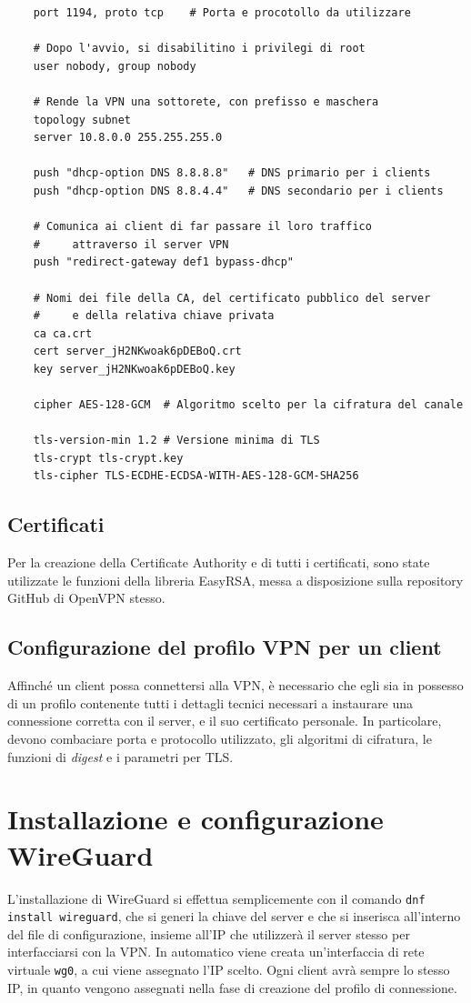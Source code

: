 \begin{verbatim}
    port 1194, proto tcp    # Porta e procotollo da utilizzare
    
    # Dopo l'avvio, si disabilitino i privilegi di root
    user nobody, group nobody   

    # Rende la VPN una sottorete, con prefisso e maschera
    topology subnet         
    server 10.8.0.0 255.255.255.0

    push "dhcp-option DNS 8.8.8.8"   # DNS primario per i clients
    push "dhcp-option DNS 8.8.4.4"   # DNS secondario per i clients

    # Comunica ai client di far passare il loro traffico 
    #     attraverso il server VPN
    push "redirect-gateway def1 bypass-dhcp"   

    # Nomi dei file della CA, del certificato pubblico del server 
    #     e della relativa chiave privata
    ca ca.crt
    cert server_jH2NKwoak6pDEBoQ.crt
    key server_jH2NKwoak6pDEBoQ.key
    
    cipher AES-128-GCM  # Algoritmo scelto per la cifratura del canale

    tls-version-min 1.2 # Versione minima di TLS
    tls-crypt tls-crypt.key
    tls-cipher TLS-ECDHE-ECDSA-WITH-AES-128-GCM-SHA256  
\end{verbatim}

\subsection{Certificati}
Per la creazione della Certificate Authority e di tutti i certificati, sono state utilizzate le funzioni della libreria EasyRSA, messa a disposizione sulla repository GitHub di OpenVPN stesso.

\subsection{Configurazione del profilo VPN per un client}
Affinché un client possa connettersi alla VPN, è necessario che egli sia in possesso di un profilo contenente tutti i dettagli tecnici necessari a instaurare una connessione corretta con il server, e il suo certificato personale. In particolare, devono combaciare porta e protocollo utilizzato, gli algoritmi di cifratura, le funzioni di \emph{digest} e i parametri per TLS.

\section{Installazione e configurazione WireGuard}
L'installazione di WireGuard si effettua semplicemente con il comando \texttt{dnf install wireguard}, che si generi la chiave del server e che si inserisca all'interno del file di configurazione, insieme all'IP che utilizzerà il server stesso per interfacciarsi con la VPN. In automatico viene creata un'interfaccia di rete virtuale \texttt{wg0}, a cui viene assegnato l'IP scelto.
Ogni client avrà sempre lo stesso IP, in quanto vengono assegnati nella fase di creazione del profilo di connessione.

